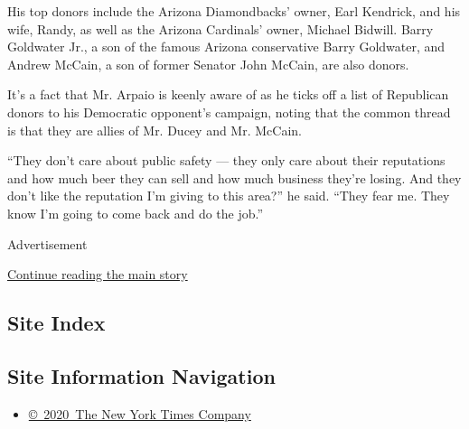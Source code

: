 His top donors include the Arizona Diamondbacks' owner, Earl Kendrick,
and his wife, Randy, as well as the Arizona Cardinals' owner, Michael
Bidwill. Barry Goldwater Jr., a son of the famous Arizona conservative
Barry Goldwater, and Andrew McCain, a son of former Senator John McCain,
are also donors.

It's a fact that Mr. Arpaio is keenly aware of as he ticks off a list of
Republican donors to his Democratic opponent's campaign, noting that the
common thread is that they are allies of Mr. Ducey and Mr. McCain.

``They don't care about public safety --- they only care about their
reputations and how much beer they can sell and how much business
they're losing. And they don't like the reputation I'm giving to this
area?'' he said. ``They fear me. They know I'm going to come back and do
the job.''

Advertisement

\protect\hyperlink{after-bottom}{Continue reading the main story}

\hypertarget{site-index}{%
\subsection{Site Index}\label{site-index}}

\hypertarget{site-information-navigation}{%
\subsection{Site Information
Navigation}\label{site-information-navigation}}

\begin{itemize}
\tightlist
\item
  \href{https://help.nytimes.com/hc/en-us/articles/115014792127-Copyright-notice}{©~2020~The
  New York Times Company}
\end{itemize}

